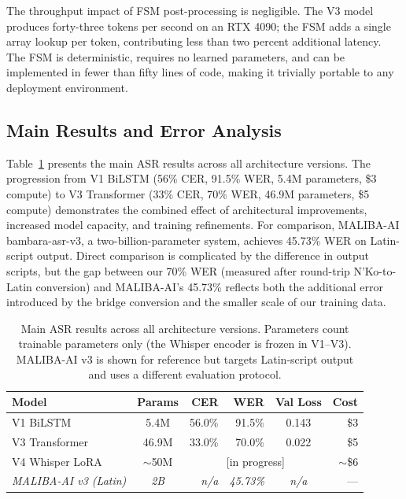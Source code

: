 \documentclass[11pt]{article}
\newcommand{\nko}{N'Ko}
\begin{document}
The throughput impact of FSM post-processing is negligible. The V3 model produces forty-three tokens per second on an RTX 4090; the FSM adds a single array lookup per token, contributing less than two percent additional latency. The FSM is deterministic, requires no learned parameters, and can be implemented in fewer than fifty lines of code, making it trivially portable to any deployment environment.

\subsection{Main Results and Error Analysis}
\label{sec:asr_results}

Table~\ref{tab:main_results} presents the main ASR results across all architecture versions. The progression from V1 BiLSTM (56\% CER, 91.5\% WER, 5.4M parameters, \$3 compute) to V3 Transformer (33\% CER, 70\% WER, 46.9M parameters, \$5 compute) demonstrates the combined effect of architectural improvements, increased model capacity, and training refinements. For comparison, MALIBA-AI bambara-asr-v3, a two-billion-parameter system, achieves 45.73\% WER on Latin-script output. Direct comparison is complicated by the difference in output scripts, but the gap between our 70\% WER (measured after round-trip \nko{}-to-Latin conversion) and MALIBA-AI's 45.73\% reflects both the additional error introduced by the bridge conversion and the smaller scale of our training data.

\begin{table}[ht]
\centering
\caption{Main ASR results across all architecture versions. Parameters count trainable parameters only (the Whisper encoder is frozen in V1--V3). MALIBA-AI v3 is shown for reference but targets Latin-script output and uses a different evaluation protocol.}
\label{tab:main_results}
\begin{tabular}{@{}lcrrcr@{}}
\toprule
Model & Params & CER & WER & Val Loss & Cost \\
\midrule
V1 BiLSTM & 5.4M & 56.0\% & 91.5\% & 0.143 & \$3 \\
V3 Transformer & 46.9M & 33.0\% & 70.0\% & 0.022 & \$5 \\
V4 Whisper LoRA & $\sim$50M & \multicolumn{3}{c}{[in progress]} & $\sim$\$6 \\
\emph{MALIBA-AI v3 (Latin)} & \emph{2B} & \emph{n/a} & \emph{45.73\%} & \emph{n/a} & --- \\
\bottomrule
\end{tabular}
\end{table}
\end{document}
